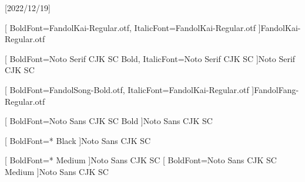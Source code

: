 
[2022/12/19]

\setsansfont{TeX Gyre Heros}	%





[
	BoldFont=FandolKai-Regular.otf, ItalicFont=FandolKai-Regular.otf
]{FandolKai-Regular.otf}

[
	BoldFont=Noto Serif CJK SC Bold,
	ItalicFont=Noto Serif CJK SC
]{Noto Serif CJK SC}

[
	BoldFont=FandolSong-Bold.otf,
	ItalicFont=FandolKai-Regular.otf
]{FandolFang-Regular.otf}

[
	BoldFont=Noto Sans CJK SC Bold
]{Noto Sans CJK SC}


[
	BoldFont=* Black
]{Noto Sans CJK SC}

[
	BoldFont=* Medium
]{Noto Sans CJK SC}	%
[
	BoldFont=Noto Sans CJK SC Medium
]{Noto Sans CJK SC}	%


\newcommand\kaishu{\CJKfamily{kai}} %
\newcommand\songti{\CJKfamily{song}} %
\newcommand\heiti{\sffamily\CJKfamily{hei}}	%
\newcommand\thmheiti{\CJKfamily{hei2}}	%
\newcommand\fangsong{\CJKfamily{fangsong}} %
\renewcommand{\em}{\bfseries\mathversion{bold}\CJKfamily{emfont}} %
